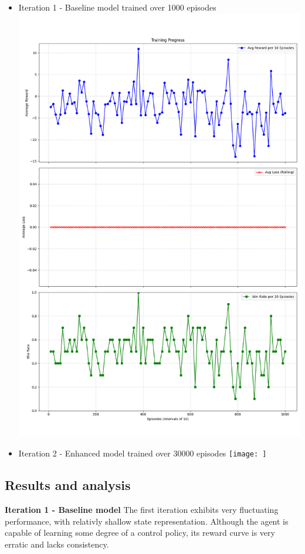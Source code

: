 \begin{itemize}
    \item Iteration 1 - Baseline model trained over 1000 episodes
    \includegraphics[width=.5]{assets/iteration-1-graphs.png}
    \item Iteration 2 - Enhanced model trained over 30000 episodes
    \texttt{[image: ]}
\end{itemize}


\subsection{Results and analysis}
\textbf{Iteration 1 - Baseline model}
The first iteration exhibits very fluctuating performance, with relativly shallow 
state representation. Although the agent is capable of learning some degree of a control
policy, its reward curve is very erratic and lacks consistency.
